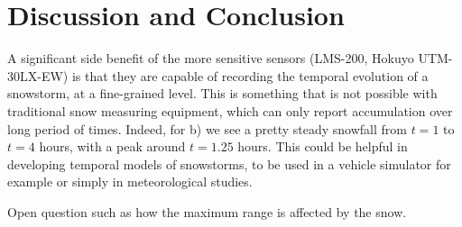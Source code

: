 \section{Discussion and Conclusion}

A significant side benefit of the more sensitive sensors (LMS-200, Hokuyo UTM-30LX-EW) is that they are capable of recording the temporal evolution of a snowstorm, at a fine-grained level. This is something that is not possible with traditional snow measuring equipment, which can only report accumulation over long period of times. Indeed, for b) we see a pretty steady snowfall from $t=1$ to $t=4$ hours, with a peak around $t=1.25$ hours. This could be helpful in developing temporal models of snowstorms, to be used in a vehicle simulator for example or simply in meteorological studies.

Open question such as how the maximum range is affected by the snow.
